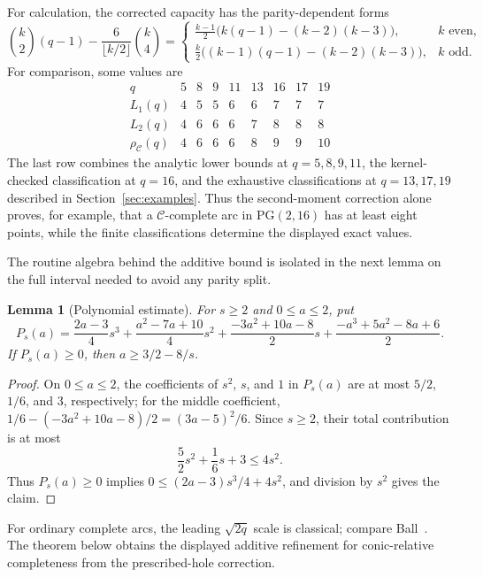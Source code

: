 \documentclass[11pt]{article}
\newtheorem{estimate}[theorem]{Lemma}
\theoremstyle{definition}
\theoremstyle{remark}
\newcommand{\PG}{\mathrm{PG}}
\newcommand{\cC}{\mathcal{C}}
\newcommand{\rhoC}{\rho_{\cC}}
\begin{document}
For calculation, the corrected capacity has the parity-dependent forms
\begin{equation}
 \binom{k}{2}(q-1)-\frac{6}{\lfloor k/2\rfloor}\binom{k}{4}
 =
 \begin{cases}
 \displaystyle
 \frac{k-1}{2}\bigl(k(q-1)-(k-2)(k-3)\bigr),&k\text{ even},\\[6pt]
 \displaystyle
 \frac{k}{2}\bigl((k-1)(q-1)-(k-2)(k-3)\bigr),&k\text{ odd}.
 \end{cases}
\label{eq:parity-capacity}
\end{equation}
For comparison, some values are
\[
\begin{array}{c|rrrrrrrr}
q&5&8&9&11&13&16&17&19\\ \hline
L_1(q)&4&5&5&6&6&7&7&7\\
L_2(q)&4&6&6&6&7&8&8&8\\
\rhoC(q)&4&6&6&6&8&9&9&10
\end{array}
\]
The last row combines the analytic lower bounds at $q=5,8,9,11$, the
kernel-checked classification at $q=16$, and the exhaustive classifications
at $q=13,17,19$ described in Section~\ref{sec:examples}.  Thus the
second-moment correction alone proves, for example, that a
$\cC$-complete arc in $\PG(2,16)$ has at least eight points, while the
finite classifications determine the displayed exact values.

The routine algebra behind the additive bound is isolated in the next lemma
on the full interval needed to avoid any parity split.

\begin{estimate}[Polynomial estimate]
\label{lem:polynomial-estimate}
For $s\ge2$ and $0\le a\le2$, put
\[
 P_s(a)=
 \frac{2a-3}{4}s^3
 +\frac{a^2-7a+10}{4}s^2
 +\frac{-3a^2+10a-8}{2}s
 +\frac{-a^3+5a^2-8a+6}{2}.
\]
If $P_s(a)\ge0$, then $a\ge3/2-8/s$.
\end{estimate}

\begin{proof}
On $0\le a\le2$, the coefficients of $s^2$, $s$, and $1$ in $P_s(a)$
are at most $5/2$, $1/6$, and $3$, respectively; for the middle coefficient,
\(1/6-(-3a^2+10a-8)/2=(3a-5)^2/6\).  Since $s\ge2$, their total
contribution is at most
\[
 \frac52s^2+\frac16s+3\le4s^2.
\]
Thus $P_s(a)\ge0$ implies
$0\le(2a-3)s^3/4+4s^2$, and division by $s^2$ gives the claim.
\end{proof}

For ordinary complete arcs, the leading \(\sqrt{2q}\) scale is classical;
compare Ball~\cite[Theorem~3.1]{Ball1997}.  The theorem below obtains the
displayed additive refinement for conic-relative completeness from the
prescribed-hole correction.
\end{document}
